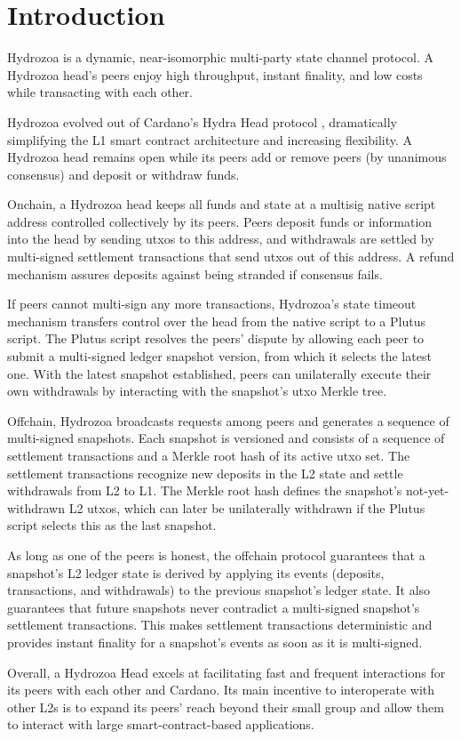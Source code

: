 \documentclass[../hydrozoa.tex]{subfiles}
\begin{document}
\section*{Introduction}%
\label{h:introduction}


Hydrozoa is a dynamic, near-isomorphic multi-party state channel protocol.
A Hydrozoa head's peers enjoy high throughput, instant finality, and low costs while transacting with each other.

Hydrozoa evolved out of Cardano's Hydra Head protocol \citep{NagelEtAlHydraHeadV1Specification2024}, dramatically simplifying the L1 smart contract architecture and increasing flexibility.
A Hydrozoa head remains open while its peers add or remove peers (by unanimous consensus) and deposit or withdraw funds.

Onchain, a Hydrozoa head keeps all funds and state at a multisig native script address controlled collectively by its peers.
Peers deposit funds or information into the head by sending utxos to this address,
and withdrawals are settled by multi-signed settlement transactions that send utxos out of this address.
A refund mechanism assures deposits against being stranded if consensus fails.

If peers cannot multi-sign any more transactions, Hydrozoa's state timeout mechanism transfers control over the head from the native script to a Plutus script.
The Plutus script resolves the peers' dispute by allowing each peer to submit a multi-signed ledger snapshot version, from which it selects the latest one.
With the latest snapshot established, peers can unilaterally execute their own withdrawals by interacting with the snapshot's utxo Merkle tree.

Offchain, Hydrozoa broadcasts requests among peers and generates a sequence of multi-signed snapshots.
Each snapshot is versioned and consists of a sequence of settlement transactions and a Merkle root hash of its active utxo set.
The settlement transactions recognize new deposits in the L2 state and settle withdrawals from L2 to L1.
The Merkle root hash defines the snapshot's not-yet-withdrawn L2 utxos, which can later be unilaterally withdrawn if the Plutus script selects this as the last snapshot.

As long as one of the peers is honest, the offchain protocol guarantees that a snapshot's L2 ledger state is derived by applying its events (deposits, transactions, and withdrawals) to the previous snapshot's ledger state.
It also guarantees that future snapshots never contradict a multi-signed snapshot's settlement transactions.
This makes settlement transactions deterministic and provides instant finality for a snapshot's events as soon as it is multi-signed.

Overall, a Hydrozoa Head excels at facilitating fast and frequent interactions for its peers with each other and Cardano.
Its main incentive to interoperate with other L2s is to expand its peers' reach beyond their small group and allow them to interact with large smart-contract-based applications.
\end{document}
